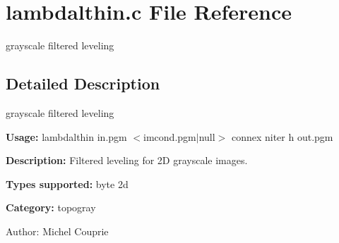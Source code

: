 \section{lambdalthin.c File Reference}
\label{lambdalthin_8c}
grayscale filtered leveling  




\label{_details}
\subsection{Detailed Description}
grayscale filtered leveling 

{\bf Usage:} lambdalthin in.pgm $<$imcond.pgm$|$null$>$ connex niter h out.pgm

{\bf Description:} Filtered leveling for 2D grayscale images.

{\bf Types supported:} byte 2d

{\bf Category:} topogray

\begin{Desc}
\item[Author:]Michel Couprie \end{Desc}
